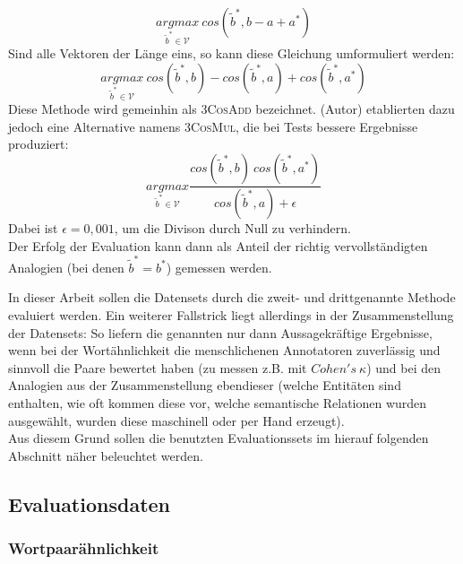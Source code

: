 \begin{enumerate}
      \begin{equation}
        \underset{\tilde{b}^* \in \mathcal{V}}{argmax}\ cos(\tilde{b}^*, b - a + a^*)
      \end{equation}
      Sind alle Vektoren der Länge eins, so kann diese Gleichung umformuliert werden:
      \begin{equation}
        \underset{\tilde{b}^* \in \mathcal{V}}{argmax}\ cos(\tilde{b}^*, b) - cos(\tilde{b}^*, a) + cos(\tilde{b}^*, a^*)
      \end{equation}
      Diese Methode wird gemeinhin als \textsc{3CosAdd} bezeichnet. (Autor) etablierten dazu jedoch
      eine Alternative namens \textsc{3CosMul}, die bei Tests bessere Ergebnisse produziert:
      \begin{equation}
        \underset{\tilde{b}^* \in \mathcal{V}}{argmax} \frac{cos(\tilde{b}^*, b)\ cos(\tilde{b}^*, a^*)}{cos(\tilde{b}^*, a) + \epsilon}
      \end{equation}
      Dabei ist $\epsilon = 0,001$, um die Divison durch Null zu verhindern.\\
      Der Erfolg der Evaluation kann dann als Anteil der richtig vervollständigten Analogien (bei denen $\tilde{b}^* = b^*$) gemessen werden.
  \end{enumerate}
  In dieser Arbeit sollen die Datensets durch die zweit- und drittgenannte Methode evaluiert werden.
  Ein weiterer Fallstrick liegt allerdings in der Zusammenstellung der Datensets: So liefern
  die genannten nur dann Aussagekräftige Ergebnisse, wenn bei der Wortähnlichkeit die menschlichenen Annotatoren
  zuverlässig und sinnvoll die Paare bewertet haben (zu messen z.B. mit $Cohen's\ \kappa$) und bei
  den Analogien aus der Zusammenstellung ebendieser (welche Entitäten sind enthalten, wie oft kommen diese vor,
  welche semantische Relationen wurden ausgewählt, wurden diese maschinell oder per Hand erzeugt).\\
  Aus diesem Grund sollen die benutzten Evaluationssets im hierauf folgenden Abschnitt näher beleuchtet werden.

  \subsection{Evaluationsdaten}

    \subsubsection{Wortpaarähnlichkeit}

